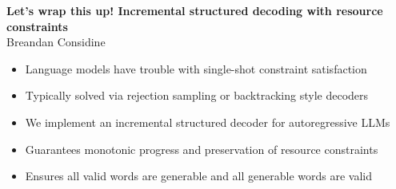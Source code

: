 \documentclass[portrait,a0b,final,a4resizeable]{a0poster}
\begin{document}
  \begin{poster}
    \vspace{-0.3cm}
    \begin{center}
      \begin{pcolumn}{1.03}
        \begin{minipage}[c][9cm][c]{0.85\textwidth}
          \begin{center}
          {\Huge \textbf{Let's wrap this up! Incremental structured decoding with resource constraints}}\\[10mm]
          {\huge Breandan Considine}
          \end{center}
        \end{minipage}
      \end{pcolumn}
    \end{center}

    \vspace*{-0.5cm}

    \large



    \Large

    \begin{multicols}{2}



      \vspace*{-1cm}
      \null\hspace*{2.5cm}\begin{minipage}[c]{0.88\columnwidth}
      \renewcommand\labelitemi{$\vcenter{\hbox{\small\bullet}}$}
      \begin{itemize}
        \item {} Language models have trouble with single-shot constraint satisfaction
        \item {} Typically solved via rejection sampling or backtracking style decoders
        \item {} We implement an incremental structured decoder for autoregressive LLMs
        \item {} Guarantees monotonic progress and preservation of resource constraints
        \item {} Ensures all valid words are generable and all generable words are valid
      \end{itemize}
      \end{minipage}


\end{multicols}
\end{poster}
\end{document}
